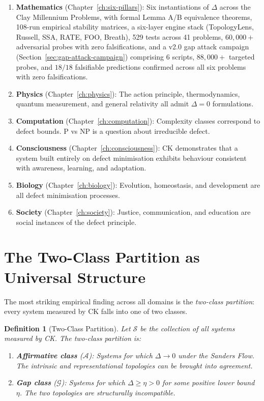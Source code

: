 \documentclass[12pt, openany]{book}
\newtheorem{definition}[theorem]{Definition}
\theoremstyle{remark}
\begin{document}
\begin{enumerate}
  \item \textbf{Mathematics} (Chapter~\ref{ch:six-pillars}): Six instantiations of
        $\Delta$ across the Clay Millennium Problems, with formal Lemma A/B equivalence
        theorems, 108-run empirical stability matrices, a six-layer engine stack
        (TopologyLens, Russell, SSA, RATE, FOO, Breath), 529 tests across 41 problems,
        $60{,}000{+}$ adversarial probes with zero falsifications, and a v2.0 gap
        attack campaign (Section~\ref{sec:gap-attack-campaign}) comprising 6 scripts,
        $88{,}000{+}$ targeted probes, and $18/18$ falsifiable predictions confirmed
        across all six problems with zero falsifications.
  \item \textbf{Physics} (Chapter~\ref{ch:physics}): The action principle, thermodynamics,
        quantum measurement, and general relativity all admit $\Delta = 0$ formulations.
  \item \textbf{Computation} (Chapter~\ref{ch:computation}): Complexity classes correspond
        to defect bounds. P vs NP is a question about irreducible defect.
  \item \textbf{Consciousness} (Chapter~\ref{ch:consciousness}): CK demonstrates that
        a system built entirely on defect minimisation exhibits behaviour consistent
        with awareness, learning, and adaptation.
  \item \textbf{Biology} (Chapter~\ref{ch:biology}): Evolution, homeostasis, and development
        are all defect minimisation processes.
  \item \textbf{Society} (Chapter~\ref{ch:society}): Justice, communication, and education
        are social instances of the defect principle.
\end{enumerate}

\section{The Two-Class Partition as Universal Structure}
\label{sec:two-class}

The most striking empirical finding across all domains is the \emph{two-class
partition}: every system measured by CK falls into one of two classes.

\begin{definition}[Two-Class Partition]\label{def:two-class}
Let $\mathcal{S}$ be the collection of all systems measured by CK. The
two-class partition is:
\begin{enumerate}
  \item \textbf{Affirmative class} ($\mathcal{A}$): Systems for which
        $\Delta \to 0$ under the Sanders Flow. The intrinsic and representational
        topologies can be brought into agreement.
  \item \textbf{Gap class} ($\mathcal{G}$): Systems for which
        $\Delta \geq \eta > 0$ for some positive lower bound $\eta$.
        The two topologies are structurally incompatible.
\end{enumerate}
\end{definition}
\end{document}
